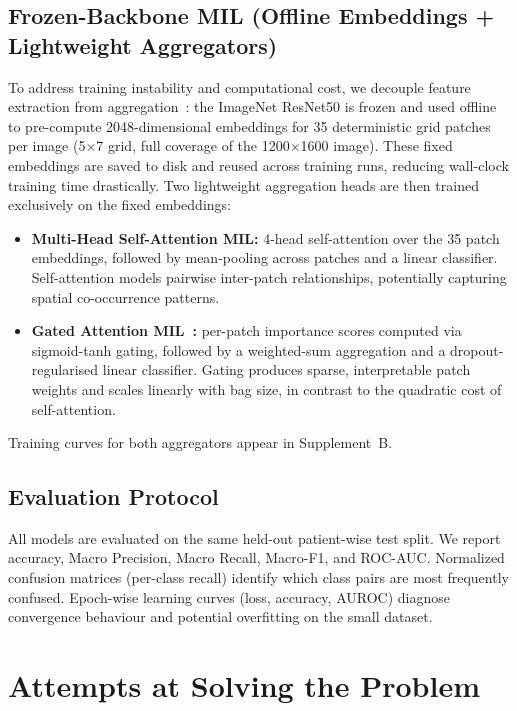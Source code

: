 \documentclass[10pt,twocolumn,letterpaper]{article}
\begin{document}
\subsection{Frozen-Backbone MIL (Offline Embeddings + Lightweight Aggregators)}
To address training instability and computational cost, we decouple feature extraction from aggregation~\cite{chen2022}: the ImageNet ResNet50 is frozen and used offline to pre-compute 2048-dimensional embeddings for 35 deterministic grid patches per image (5$\times$7 grid, full coverage of the 1200$\times$1600 image). These fixed embeddings are saved to disk and reused across training runs, reducing wall-clock training time drastically. Two lightweight aggregation heads are then trained exclusively on the fixed embeddings:
\begin{itemize}
    \item \textbf{Multi-Head Self-Attention MIL:} 4-head self-attention over the 35 patch embeddings, followed by mean-pooling across patches and a linear classifier. Self-attention models pairwise inter-patch relationships, potentially capturing spatial co-occurrence patterns.
    \item \textbf{Gated Attention MIL~\cite{ilse2018}:} per-patch importance scores computed via sigmoid-tanh gating, followed by a weighted-sum aggregation and a dropout-regularised linear classifier. Gating produces sparse, interpretable patch weights and scales linearly with bag size, in contrast to the quadratic cost of self-attention.
\end{itemize}
Training curves for both aggregators appear in Supplement~B.

\subsection{Evaluation Protocol}
All models are evaluated on the same held-out patient-wise test split. We report accuracy, Macro Precision, Macro Recall, Macro-F1, and ROC-AUC. Normalized confusion matrices (per-class recall) identify which class pairs are most frequently confused. Epoch-wise learning curves (loss, accuracy, AUROC) diagnose convergence behaviour and potential overfitting on the small dataset.

\section{Attempts at Solving the Problem}
\label{sec:attempts}
\end{document}
